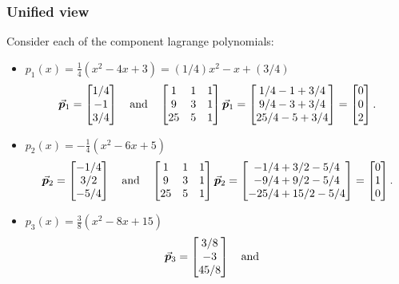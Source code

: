 \documentclass[MathsNotesBase.tex]{subfiles}
\begin{document}
{	\bigskip\bigskip
	\subsubsection{Unified view}
	\bigskip
	Consider each of the component lagrange polynomials:
	\begin{itemize}
		\item{${ p_1(x) = \frac{1}{4}(x^2-4x+3) = (1/4)x^2 - x + (3/4) }$
			\[ \vec{\bm{p}}_1 = \begin{bmatrix}1/4\\-1\\3/4\end{bmatrix} \hspace{10pt}\text{and}\hspace{10pt} 
				\begin{bmatrix}
				1 & 1 & 1\\
				9 & 3 & 1\\
				25 & 5 & 1
				\end{bmatrix}
				\vec{\bm{p}}_1 =
				\begin{bmatrix}
				1/4 - 1 + 3/4\\
				9/4 - 3 + 3/4\\
				25/4 - 5 + 3/4
				\end{bmatrix} =
				\begin{bmatrix}0\\0\\2\end{bmatrix}.
			\]
		}
		\item{${ p_2(x) = -\frac{1}{4}(x^2-6x+5) }$
			\[ \vec{\bm{p}}_2 = \begin{bmatrix}-1/4\\3/2\\-5/4\end{bmatrix} \hspace{10pt}\text{and}\hspace{10pt} 
				\begin{bmatrix}
				1 & 1 & 1\\
				9 & 3 & 1\\
				25 & 5 & 1
				\end{bmatrix}
				\vec{\bm{p}}_2 =
				\begin{bmatrix}
				-1/4 + 3/2 - 5/4\\
				-9/4 + 9/2 - 5/4\\
				-25/4 + 15/2 - 5/4
				\end{bmatrix} =
				\begin{bmatrix}0\\1\\0\end{bmatrix}.
			\]
		}
		\item{${ p_3(x) = \frac{3}{8}(x^2-8x+15) }$
			\[ \vec{\bm{p}}_3 = \begin{bmatrix}3/8\\-3\\45/8\end{bmatrix} \hspace{10pt}\text{and}\hspace{10pt} 
\]}
\end{itemize}}
\end{document}
